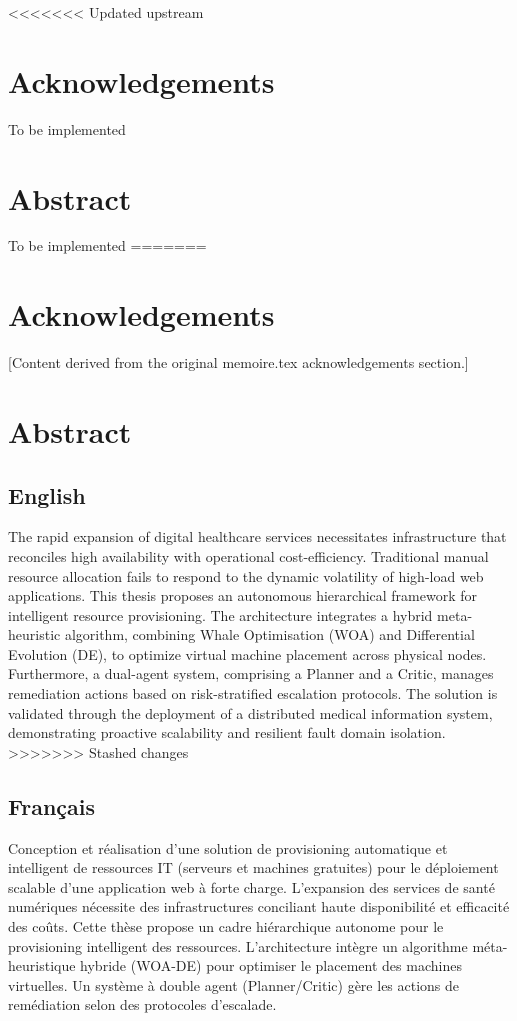 \documentclass[12pt,a4paper]{report}
\begin{document}
<<<<<<< Updated upstream
\newpage
\chapter*{Acknowledgements}
To be implemented

\newpage
\chapter*{Abstract}
To be implemented
=======
\chapter*{Acknowledgements}
[Content derived from the original memoire.tex acknowledgements section.]

\chapter*{Abstract}

\section*{English}
The rapid expansion of digital healthcare services necessitates infrastructure that reconciles high availability with operational cost-efficiency. Traditional manual resource allocation fails to respond to the dynamic volatility of high-load web applications. This thesis proposes an autonomous hierarchical framework for intelligent resource provisioning. The architecture integrates a hybrid meta-heuristic algorithm, combining Whale Optimisation (WOA) and Differential Evolution (DE), to optimize virtual machine placement across physical nodes. Furthermore, a dual-agent system, comprising a Planner and a Critic, manages remediation actions based on risk-stratified escalation protocols. The solution is validated through the deployment of a distributed medical information system, demonstrating proactive scalability and resilient fault domain isolation.
>>>>>>> Stashed changes

\section*{Français}
Conception et réalisation d'une solution de provisioning automatique et intelligent de ressources IT (serveurs et machines gratuites) pour le déploiement scalable d'une application web à forte charge. L'expansion des services de santé numériques nécessite des infrastructures conciliant haute disponibilité et efficacité des coûts. Cette thèse propose un cadre hiérarchique autonome pour le provisioning intelligent des ressources. L'architecture intègre un algorithme méta-heuristique hybride (WOA-DE) pour optimiser le placement des machines virtuelles. Un système à double agent (Planner/Critic) gère les actions de remédiation selon des protocoles d'escalade.
\end{document}
